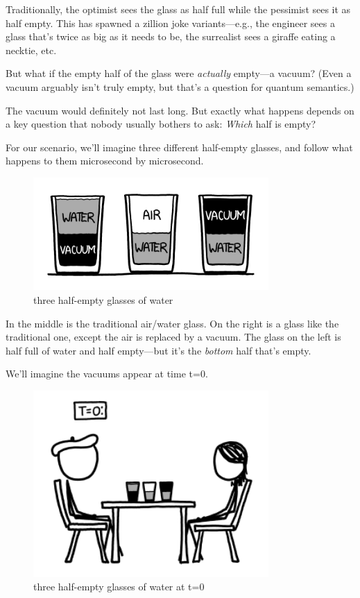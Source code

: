 {Traditionally, the optimist sees the glass as half full while the pessimist sees it as half empty. This has spawned a zillion joke variants—e.g., the engineer sees a glass that’s twice as big as it needs to be, the surrealist sees a giraffe eating a necktie, etc.}

{But what if the empty half of the glass were \emph{actually} empty—a vacuum? (Even a vacuum arguably isn’t truly empty, but that’s a question for quantum semantics.)}

{The vacuum would definitely not last long. But exactly what happens depends on a key question that nobody usually bothers to ask: \emph{Which} half is empty?}

{For our scenario, we’ll imagine three different half-empty glasses, and follow what happens to them microsecond by microsecond.}

\begin{figure}[!htbp]
\centering
\includegraphics[scale=0.5, max width=0.8\textwidth]{imgs/a/6/glass_three.png}
\caption{three half-empty glasses of water}
\end{figure}

{In the middle is the traditional air/water glass. On the right is a glass like the traditional one, except the air is replaced by a vacuum. The glass on the left is half full of water and half empty—but it’s the \emph{bottom} half that’s empty.}

{We’ll imagine the vacuums appear at time t=0.}

\begin{figure}[!htbp]
\centering
\includegraphics[scale=0.5, max width=0.8\textwidth]{imgs/a/6/glass_0s.png}
\caption{three half-empty glasses of water at t=0}
\end{figure}

